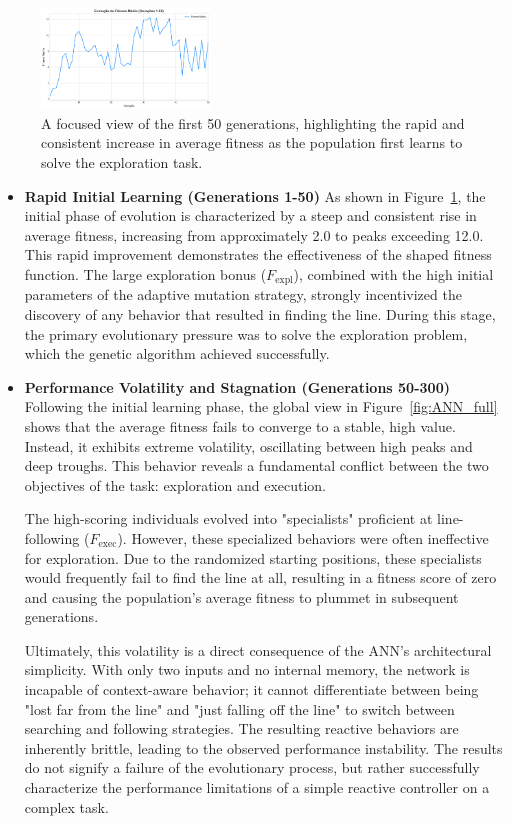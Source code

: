 \documentclass[final,5p,times,twocolumn,authoryear]{elsarticle}
\begin{document}
\begin{figure}[H]
    \centering
    \includegraphics[width=0.4\textwidth]{figures/ANN_MUtationVariable_ChangedWindow.png}
    \caption{A focused view of the first 50 generations, highlighting the rapid and consistent increase in average fitness as the population first learns to solve the exploration task.}
    \label{fig:ANN_zoom}
\end{figure}
\begin{itemize}
    \item \textbf{Rapid Initial Learning (Generations 1-50)}
    As shown in Figure~\ref{fig:ANN_zoom}, the initial phase of evolution is characterized by a steep and consistent rise in average fitness, increasing from approximately 2.0 to peaks exceeding 12.0. This rapid improvement demonstrates the effectiveness of the shaped fitness function. The large exploration bonus ($F_{\text{expl}}$), combined with the high initial parameters of the adaptive mutation strategy, strongly incentivized the discovery of any behavior that resulted in finding the line. During this stage, the primary evolutionary pressure was to solve the exploration problem, which the genetic algorithm achieved successfully.

    \item  \textbf{Performance Volatility and Stagnation (Generations 50-300)}
Following the initial learning phase, the global view in Figure~\ref{fig:ANN_full} shows that the average fitness fails to converge to a stable, high value. Instead, it exhibits extreme volatility, oscillating between high peaks and deep troughs. This behavior reveals a fundamental conflict between the two objectives of the task: exploration and execution.

The high-scoring individuals evolved into "specialists" proficient at line-following ($F_{\text{exec}}$). However, these specialized behaviors were often ineffective for exploration. Due to the randomized starting positions, these specialists would frequently fail to find the line at all, resulting in a fitness score of zero and causing the population's average fitness to plummet in subsequent generations.

Ultimately, this volatility is a direct consequence of the ANN's architectural simplicity. With only two inputs and no internal memory, the network is incapable of context-aware behavior; it cannot differentiate between being "lost far from the line" and "just falling off the line" to switch between searching and following strategies. The resulting reactive behaviors are inherently brittle, leading to the observed performance instability. The results do not signify a failure of the evolutionary process, but rather successfully characterize the performance limitations of a simple reactive controller on a complex task.
\end{itemize}
\end{document}
